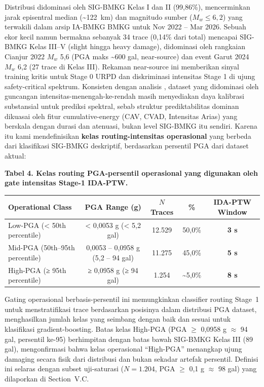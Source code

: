 \documentclass[10pt]{article}
\begin{document}
Distribusi didominasi oleh SIG-BMKG Kelas I dan II (99,86\%), mencerminkan jarak episentral median (\textasciitilde122~km) dan magnitudo sumber (\(M_w \leq 6{,}2\)) yang terwakili dalam arsip IA-BMKG BMKG untuk Nov 2022 -- Mar 2026. Sebuah ekor kecil namun bermakna sebanyak 34 trace (0,14\% dari total) mencapai SIG-BMKG Kelas III--V (slight hingga heavy damage), didominasi oleh rangkaian Cianjur 2022 \(M_w\) 5,6 (PGA maks \textasciitilde600 gal, near-source) dan event Garut 2024 \(M_w\) 6,2 (27 trace di Kelas III). Rekaman near-source ini memberikan sinyal training kritis untuk Stage 0 URPD dan diskriminasi intensitas Stage 1 di ujung safety-critical spektrum. Konsisten dengan analisis \citet{ref19}, dataset yang didominasi oleh guncangan intensitas-menengah-ke-rendah masih menyediakan daya kalibrasi substansial untuk prediksi spektral, sebab struktur prediktabilitas dominan dikuasai oleh fitur cumulative-energy (CAV, CVAD, Intensitas Arias) yang berskala dengan durasi dan atenuasi, bukan level SIG-BMKG itu sendiri. Karena itu kami mendefinisikan \textbf{kelas routing-intensitas operasional} yang berbeda dari klasifikasi SIG-BMKG deskriptif, berdasarkan persentil PGA dari dataset aktual:

\par\vspace{16pt}\noindent\begingroup\centering\fontsize{8}{10}\selectfont\textbf{Tabel 4. Kelas routing PGA-persentil operasional yang digunakan oleh gate intensitas Stage-1 IDA-PTW.}\par\endgroup\vspace{6pt}

\begin{longtable}[]{@{}lcccc@{}}
\toprule
Operational Class & PGA Range (g) & \(N\) Traces & \% & IDA-PTW Window\tabularnewline
\midrule
\endhead
Low-PGA (\textless{} 50th percentile) & \textless{} 0,0053 g (\textless{} 5,2 gal) & 12.529 & 50,0\% & \textbf{3 s}\tabularnewline
Mid-PGA (50th--95th percentile) & 0,0053 -- 0,0958 g (5,2 -- 94 gal) & 11.275 & 45,0\% & \textbf{5 s}\tabularnewline
High-PGA (≥ 95th percentile) & ≥ 0,0958 g (≥ 94 gal) & 1.254 & \textasciitilde5,0\% & \textbf{8 s}\tabularnewline
\bottomrule
\end{longtable}

Gating operasional berbasis-persentil ini memungkinkan classifier routing Stage~1 untuk menstratifikasi trace berdasarkan posisinya dalam distribusi PGA dataset, menghasilkan jumlah kelas yang seimbang dengan baik dan sesuai untuk klasifikasi gradient-boosting. Batas kelas High-PGA (PGA \(\geq\) 0,0958 g \(\approx\) 94 gal, persentil ke-95) berhimpitan dengan batas bawah SIG-BMKG Kelas III (89 gal), mengonfirmasi bahwa kelas operasional ``High-PGA'' menangkap ujung damaging secara fisik dari distribusi dan bukan sekadar artefak persentil. Definisi ini selaras dengan subset uji-saturasi (\(N = 1.204\), PGA \(\geq\) 0,1 g \(\approx\) 98 gal) yang dilaporkan di Section~V.C.
\end{document}
